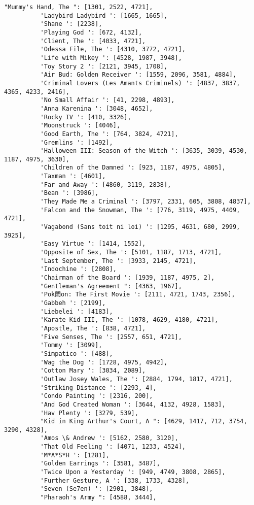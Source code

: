 \documentclass[11pt]{article}
\begin{document}
\begin{Verbatim}[commandchars=\\\{\}]
          "Mummy's Hand, The ": [1301, 2522, 4721],
          'Ladybird Ladybird ': [1665, 1665],
          'Shane ': [2238],
          'Playing God ': [672, 4132],
          'Client, The ': [4033, 4721],
          'Odessa File, The ': [4310, 3772, 4721],
          'Life with Mikey ': [4528, 1987, 3948],
          'Toy Story 2 ': [2121, 3945, 1708],
          'Air Bud: Golden Receiver ': [1559, 2096, 3581, 4884],
          'Criminal Lovers (Les Amants Criminels) ': [4837, 3837, 4365, 4233, 2416],
          'No Small Affair ': [41, 2298, 4893],
          'Anna Karenina ': [3048, 4652],
          'Rocky IV ': [410, 3326],
          'Moonstruck ': [4046],
          'Good Earth, The ': [764, 3824, 4721],
          'Gremlins ': [1492],
          'Halloween III: Season of the Witch ': [3635, 3039, 4530, 1187, 4975, 3630],
          'Children of the Damned ': [923, 1187, 4975, 4805],
          'Taxman ': [4601],
          'Far and Away ': [4860, 3119, 2838],
          'Bean ': [3986],
          'They Made Me a Criminal ': [3797, 2331, 605, 3808, 4837],
          'Falcon and the Snowman, The ': [776, 3119, 4975, 4409, 4721],
          'Vagabond (Sans toit ni loi) ': [1295, 4631, 680, 2999, 3925],
          'Easy Virtue ': [1414, 1552],
          'Opposite of Sex, The ': [5101, 1187, 1713, 4721],
          'Last September, The ': [3933, 2145, 4721],
          'Indochine ': [2808],
          'Chairman of the Board ': [1939, 1187, 4975, 2],
          "Gentleman's Agreement ": [4363, 1967],
          'Pok閙on: The First Movie ': [2111, 4721, 1743, 2356],
          'Gabbeh ': [2199],
          'Liebelei ': [4183],
          'Karate Kid III, The ': [1078, 4629, 4180, 4721],
          'Apostle, The ': [838, 4721],
          'Five Senses, The ': [2557, 651, 4721],
          'Tommy ': [3099],
          'Simpatico ': [488],
          'Wag the Dog ': [1728, 4975, 4942],
          'Cotton Mary ': [3034, 2089],
          'Outlaw Josey Wales, The ': [2884, 1794, 1817, 4721],
          'Striking Distance ': [2293, 4],
          'Condo Painting ': [2316, 200],
          'And God Created Woman ': [3644, 4132, 4928, 1583],
          'Hav Plenty ': [3279, 539],
          "Kid in King Arthur's Court, A ": [4629, 1417, 712, 3754, 3290, 4328],
          'Amos \& Andrew ': [5162, 2580, 3120],
          'That Old Feeling ': [4071, 1233, 4524],
          'M*A*S*H ': [1281],
          'Golden Earrings ': [3581, 3487],
          'Twice Upon a Yesterday ': [949, 4749, 3808, 2865],
          'Further Gesture, A ': [338, 1733, 4328],
          'Seven (Se7en) ': [2901, 3848],
          "Pharaoh's Army ": [4588, 3444],

\end{Verbatim}
\end{document}
